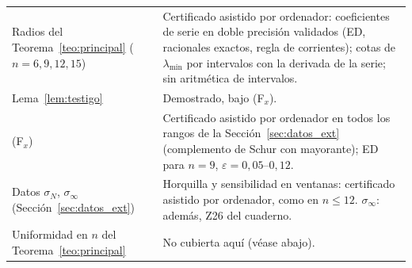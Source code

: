 \documentclass[11pt,a4paper]{article}
\theoremstyle{definition}
\theoremstyle{remark}
\newcommand{\eps}{\varepsilon}
\begin{document}
\begin{center}
\begin{tabular}{>{\raggedright}p{6.2cm}>{\raggedright\arraybackslash}p{8.3cm}}
Radios del Teorema~\ref{teo:principal} ($n=6,9,12,15$) & Certificado asistido por ordenador: coeficientes de serie en
doble precisión validados (ED, racionales exactos, regla de corrientes); cotas de $\lambda_{\min}$ por
intervalos con la derivada de la serie; sin aritmética de intervalos.\\
Lema~\ref{lem:testigo} & Demostrado, bajo (F$_x$).\\
(F$_x$) & Certificado asistido por ordenador en todos los rangos de la Sección~\ref{sec:datos_ext} (complemento de Schur con mayorante); ED para $n=9$, $\eps=0{,}05$--$0{,}12$.\\
Datos $\sigma_N$, $\sigma_\infty$ (Sección~\ref{sec:datos_ext}) & Horquilla y sensibilidad en ventanas: certificado asistido por ordenador, como en $n\le12$. $\sigma_\infty$: además, Z26 del cuaderno.\\
Uniformidad en $n$ del Teorema~\ref{teo:principal} & No cubierta aquí (véase abajo).\\
\bottomrule
\end{tabular}
\end{center}
\end{document}
